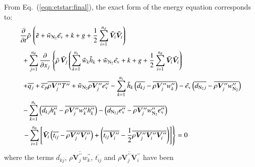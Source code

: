 \documentclass{warpdoc}
\newcommand{\alb}{\vspace{0.2cm}\\} %
\newcommand{\Cp}{{c_{p}}}
\newcommand{\nd}{{{n}_{\rm d}}}
\newcommand{\ns}{{{n}_{\rm s}}}
\newcommand{\mfd}{\displaystyle}
\newcommand{\ev}{e_{\rm v}}
\newcommand{\cNtwo}{w_{\rm N_2}}
\begin{document}
From Eq.\ (\ref{eqn:etstar:final}), the exact form of the energy equation corresponds to:
%
%
\begin{equation}
 \begin{array}{l}
    \mfd\frac{\partial}{\partial t}  \wbar{\rho}\,
       \left(  \wtilde{e}
           + 
          {\wtilde{w}_{\rm N_2}}\wtilde{\ev}
           + 
          k
           + 
          g
           + \frac{1}{2}\sum_{i=1}^{\nd}  {\wtilde{\bm{V}}_i}  {\wtilde{\bm{V}}_i}
       \right)\alb\mfd
~~    %
     + \sum_{j=1}^{\nd} \frac{\partial}{\partial x_j} \left\{ \wbar{\rho}\, {\wtilde{\bm{V}}_j}
       \left(
            \sum_{k=1}^{\ns} {\wtilde{w}_k}  {\wtilde{h}_k}
          + {\wtilde{w}_{\rm N_2}}\wtilde{\ev}  + k + g
          + \frac{1}{2}\sum_{i=1}^{\nd} {\wtilde{\bm{V}}_i}  {\wtilde{\bm{V}}_i}
       \right) \right.\alb
~~    %
    \mfd+ \overline{q_j}+\overline{\Cp}  \overline{\rho  \bm{V}_j^{{\prime\prime}}  T^{{\prime\prime}}} +{\wtilde{w}_{\rm N_2}} \overline{\rho \bm{V}_j^{{\prime\prime}} \ev^{{\prime\prime}}}
      -\sum_{k=1}^{\ns}{\wtilde{h}_k} \left( \overline{ d_{kj} }

      -\overline{\rho  \bm{V}_j^{{\prime\prime}}  w_k^{{\prime\prime}}}\right)
      -\wtilde{\ev} \left(\overline{d_{{\rm N_2}j} }       - \overline{\rho \bm{V}_j^{{\prime\prime}} \cNtwo^{{\prime\prime}}}\right)\alb
  ~~  \mfd

        - \sum_{k=1}^{\ns}\left( \overline{ d_{kj}  h_k^{{\prime\prime}} } - \overline{\rho  \bm{V}_j^{{\prime\prime}}  w_k^{{\prime\prime}}  h_k^{{\prime\prime}} } \right)
   -\left(\overline{d_{{\rm N_2}j}\ev^{{\prime\prime}} }    -\overline{\rho \bm{V}_j^{{\prime\prime}} \cNtwo^{{\prime\prime}} \ev^{{\prime\prime}}} \right)
        \alb
    ~~\mfd \left.  - \sum_{i=1}^{\nd}
       \left[
          {\wtilde{\bm{V}}_i} \left( \overline{ t_{ij} } -\overline{\rho  \bm{V}_j^{{\prime\prime}}  \bm{V}_i^{{\prime\prime}}}\right)
        + \left( \overline{ t_{ij}  \bm{V}_i^{{\prime\prime}} } -\frac{1}{2}\overline{\rho  \bm{V}_j^{{\prime\prime}}  \bm{V}_i^{{\prime\prime}}  \bm{V}_i^{{\prime\prime}} } \right)
       \right]
    \right\}= 0
 \end{array}
 \label{eqn:etstar:modeled:1}
\end{equation}
%
where the terms $ \overline{ d_{kj} } $, $ \overline{\rho  \bm{V}_j^{{\prime\prime}}  w_k^{{\prime\prime}}} $,
$ \overline{ t_{ij} } $ and $ \overline{\rho  \bm{V}_j^{{\prime\prime}}  \bm{V}_i^{{\prime\prime}}} $   have been
\end{document}
